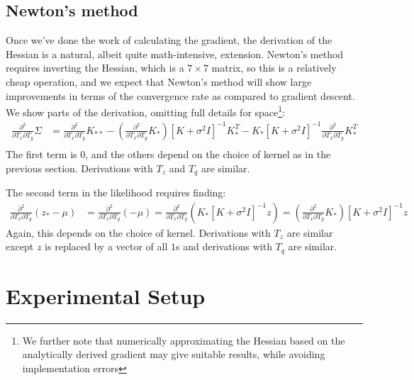 \documentclass{article} %
\begin{document}
\subsection{Newton's method}
Once we've done the work of calculating the gradient, the derivation of the Hessian is a natural, albeit quite math-intensive, extension. Newton's method requires inverting the Hessian, which is a $7 \times 7$ matrix, so this is a relatively cheap operation, and we expect that Newton's method will show large improvements in terms of the convergence rate as compared to gradient descent. We show parts of the derivation, omitting full details for space\footnote{We further note that numerically approximating the Hessian based on the analytically derived gradient may give suitable results, while avoiding implementation errors}:
\begin{align*}
\frac{\partial^2 }{\partial T_x \partial T_y} \Sigma &= \frac{\partial^2}{\partial T_x \partial T_y} K_{**} - \left(\frac{\partial^2}{\partial T_x \partial T_y}K_{*}\right) [K + \sigma^2 I]^{-1} K_*^T - K_{*} [K + \sigma^2 I]^{-1} \frac{\partial^2}{\partial T_x \partial T_y} K_*^T \\
\end{align*}
The first term is 0, and the others depend on the choice of kernel as in the previous section. Derivations with $T_z$ and $T_q$ are similar.

The second term in the likelihood requires finding:
\begin{align*}
\frac{\partial^2 }{\partial T_x \partial T_y} (z_* - \mu) &= \frac{\partial^2 }{\partial T_x \partial T_y} (- \mu) 
= \frac{\partial^2 }{\partial T_x \partial T_y}( K_* [K+\sigma^2 I]^{-1} z)
= (\frac{\partial^2 }{\partial T_x \partial T_y} K_*) [K+\sigma^2 I]^{-1} z
\end{align*}
Again, this depends on the choice of kernel. Derivations with $T_z$ are similar except $z$ is replaced by a vector of all $1$s and derivations with $T_q$ are similar.




\section{Experimental Setup}
\end{document}

